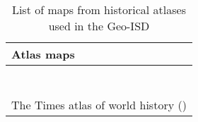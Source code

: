 \begin{table}[ht]
\centering
\begin{tabularx}{\textwidth}{l}
  \toprule
Atlas maps \\ 
  \midrule
\citet{Ajayi1985} \\ 
  \citet{Flint1976} \\ 
  \citet{Gailey1967} \\ 
  \citet{Kasule1998} \\ 
  \citet{mcevedy1996penguin} \\ 
  \citet{Oliver1985} \\ 
  \citet{Reid2012} \\ 
  The Times atlas of world history
			  (\citeyear{1978TTao}) \\ 
   \bottomrule
\end{tabularx}
\caption{List of maps from historical atlases
used in the Geo-ISD} 
\label{atlasmaps}
\end{table}
